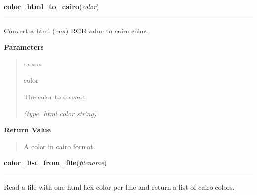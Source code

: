 \hspace{.8\funcindent}\begin{boxedminipage}{\funcwidth}

    \raggedright \textbf{color\_html\_to\_cairo}(\textit{color})

    \vspace{-1.5ex}

    \rule{\textwidth}{0.5\fboxrule}
\setlength{\parskip}{2ex}
    Convert a html (hex) RGB value to cairo color.

\setlength{\parskip}{1ex}
      \textbf{Parameters}
      \vspace{-1ex}

      \begin{quote}
        \begin{Ventry}{xxxxx}

          \item[color]

          The color to convert.

            {\it (type=html color string)}

        \end{Ventry}

      \end{quote}

      \textbf{Return Value}
    \vspace{-1ex}

      \begin{quote}
      A color in cairo format.

      \end{quote}

    \end{boxedminipage}

    \label{pygtk_chart:basics:color_list_from_file}

    \vspace{0.5ex}

\hspace{.8\funcindent}\begin{boxedminipage}{\funcwidth}

    \raggedright \textbf{color\_list\_from\_file}(\textit{filename})

    \vspace{-1.5ex}

    \rule{\textwidth}{0.5\fboxrule}
\setlength{\parskip}{2ex}
    Read a file with one html hex color per line and return a list of cairo
    colors.

\setlength{\parskip}{1ex}
    \end{boxedminipage}

